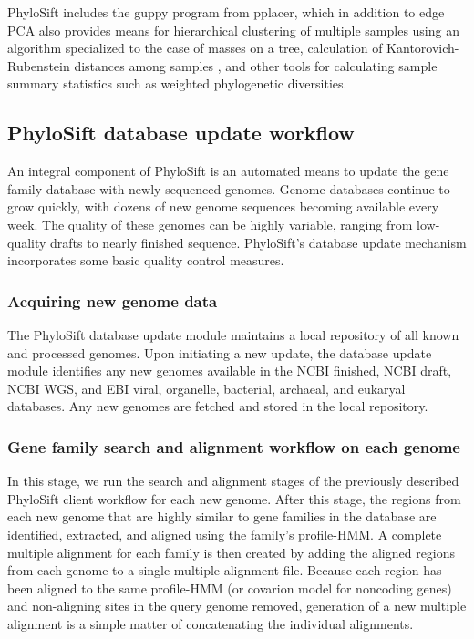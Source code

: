 \documentclass[10pt]{article}
\begin{document}
PhyloSift includes the guppy program from pplacer, which in addition to edge PCA also provides means for hierarchical clustering of multiple samples using an algorithm specialized to the case of masses on a tree, calculation of Kantorovich-Rubenstein distances among samples \cite{Evans2010}, and other tools for calculating sample summary statistics such as weighted phylogenetic diversities.

\subsection*{PhyloSift database update workflow}\label{sec:dbupdate}
An integral component of PhyloSift is an automated means to update the gene family database with newly sequenced genomes.
Genome databases continue to grow quickly, with dozens of new genome sequences becoming available every week.
The quality of these genomes can be highly variable, ranging from low-quality drafts to nearly finished sequence.
PhyloSift's database update mechanism incorporates some basic quality control measures.
\subsubsection*{Acquiring new genome data}
The PhyloSift database update module maintains a local repository of all known and processed genomes.
Upon initiating a new update, the database update module identifies any new genomes available in the NCBI finished, NCBI draft, NCBI WGS, and EBI viral, organelle, bacterial, archaeal, and eukaryal databases.
Any new genomes are fetched and stored in the local repository.
\subsubsection*{Gene family search and alignment workflow on each genome}
In this stage, we run the search and alignment stages of the previously described PhyloSift client workflow for each new genome.
After this stage, the regions from each new genome that are highly similar to gene families in the database are identified, extracted, and aligned using the family's profile-HMM.
A complete multiple alignment for each family is then created by adding the aligned regions from each genome to a single multiple alignment file.
Because each region has been aligned to the same profile-HMM (or covarion model for noncoding genes) and non-aligning sites in the query genome removed, generation of a new multiple alignment is a simple matter of concatenating the individual alignments.
\end{document}
